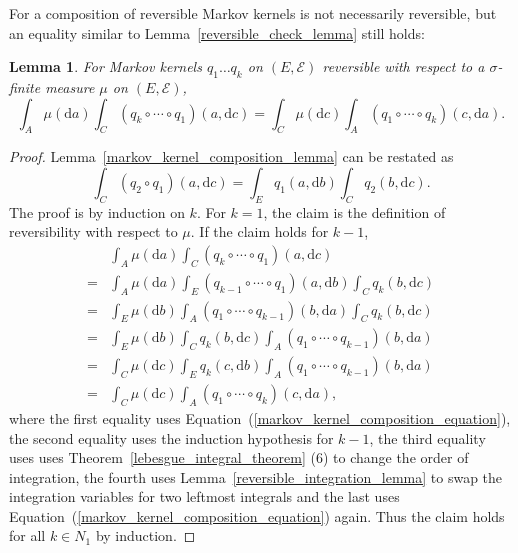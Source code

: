 \documentclass[english,twoside,openright]{HYgraduMLDS}
\newtheorem{lemma}{Lemma}[chapter]
\newcommand{\dx}{\mathrm{d}}
\begin{document}
For a composition of reversible Markov kernels is not necessarily reversible,
but an equality similar to Lemma~\ref{reversible_check_lemma} still holds:
\begin{lemma}\label{composition_reversible_multiple_lemma}
  For Markov kernels \(q_{1}\dotsc q_{k}\) on \((E, \mathcal{E})\) reversible
  with respect to a \(\sigma\)-finite measure \(\mu\) on \((E, \mathcal{E})\),
  \[
    \int_{A}\mu(\dx a)\int_{C}(q_{k}\circ \dotsb \circ q_{1})(a, \dx c)
    = \int_{C}\mu(\dx c)\int_{A}(q_{1}\circ \dotsb \circ q_{k})(c, \dx a).
  \]
\end{lemma}
\begin{proof}
  Lemma~\ref{markov_kernel_composition_lemma} can be restated as
  \begin{equation}\label{markov_kernel_composition_equation}
    \int_{C}(q_{2}\circ q_{1})(a, \dx c) = \int_{E}q_{1}(a, \dx b)\int_{C}q_{2}(b, \dx c).
  \end{equation}
  The proof is by induction on \(k\). For \(k = 1\), the claim is the definition
  of reversibility with respect to \(\mu\). If the claim holds for \(k - 1\),
  \begin{align*}
    &\int_{A}\mu(\dx a)\int_{C}(q_{k}\circ\dotsb \circ q_{1})(a, \dx c)
    \\=& \int_{A}\mu(\dx a)\int_{E}(q_{k-1}\circ \dotsb \circ q_{1})(a, \dx b)
      \int_{C}q_{k}(b, \dx c)
    \\=& \int_{E}\mu(\dx b)\int_{A}(q_{1}\circ \dotsb \circ q_{k-1})(b, \dx a)
      \int_{C}q_{k}(b, \dx c)
    \\=& \int_{E}\mu(\dx b)\int_{C}q_{k}(b, \dx c)
         \int_{A}(q_{1}\circ \dotsb \circ q_{k-1})(b, \dx a)
    \\=& \int_{C}\mu(\dx c) \int_{E}q_{k}(c, \dx b)
         \int_{A}(q_{1}\circ \dotsb \circ q_{k-1})(b, \dx a)
    \\=&\int_{C}\mu(\dx c)\int_{A}(q_{1}\circ\dotsb \circ q_{k})(c, \dx a),
  \end{align*}
  where the first equality uses Equation~(\ref{markov_kernel_composition_equation}),
  the second equality uses the induction hypothesis for \(k - 1\),
  the third equality uses uses Theorem~\ref{lebesgue_integral_theorem} (6)
  to change the order of integration, the fourth uses
  Lemma~\ref{reversible_integration_lemma}
  to swap the integration variables for two leftmost integrals
  and the last uses Equation~(\ref{markov_kernel_composition_equation}) again.
  Thus the claim holds for all \(k\in N_{1}\) by induction.
\end{proof}
\end{document}
